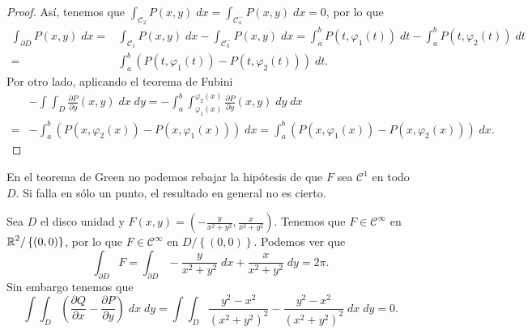 \begin{proof}
Así, tenemos que $\displaystyle \int _{\mathcal{C}_{2}}P\left(x,y\right) \; dx = \int _{\mathcal{C}_{4}^{-}}P\left(x,y\right) \; dx = 0 $, por lo que 
\[
\begin{split}
	\int _{\partial D}P\left(x,y\right) \; dx= &\int _{\mathcal{C}_{1}}P\left(x,y\right) \; dx-\int _{\mathcal{C}_{3}^{-}}P\left(x,y\right) \; dx
	=  \int^{b}_{a} P\left(t, \varphi_{1}\left(t\right)\right) \; dt - \int^{b}_{a} P\left(t, \varphi_{2}\left(t\right)\right) \; dt \\
	= &  \int^{b}_{a} \left(P\left(t, \varphi_{1}\left(t\right)\right)-P\left(t, \varphi_{2}\left(t\right)\right)\right) \; dt.
\end{split}
\]
Por otro lado, aplicando el teorema de Fubini
\[
\begin{split}
	&-\int \int _{D}\frac{\partial P}{\partial y}\left(x,y\right) \; dx \; dy =  - \int^{b}_{a} \int^{\varphi_{2}\left(x\right)}_{\varphi_{1}\left(x\right)} \frac{\partial P}{\partial y}\left(x,y\right) \; dy \; dx \\
	= & -\int^{b}_{a} \left(P\left(x,\varphi_{2}\left(x\right)\right)-P\left(x,\varphi_{1}\left(x\right)\right)\right) \; dx = \int^{b}_{a} \left(P\left(x, \varphi_{1}\left(x\right)\right)-P\left(x,\varphi_{2}\left(x\right)\right)\right) \; dx .
\end{split}
\]
\end{proof}
\begin{observation}
En el teorema de Green no podemos rebajar la hipótesis de que $\displaystyle F $ sea $\displaystyle \mathcal{C}^{1} $ en todo $\displaystyle D $. Si falla en sólo un punto, el resultado en general no es cierto.
\end{observation}
\begin{eg}
	Sea $\displaystyle D $ el disco unidad y $\displaystyle F\left(x,y\right)=\left(-\frac{y}{x^{2}+y^{2}}, \frac{x}{x^{2}+y^{2}}\right) $. Tenemos que $\displaystyle F \in \mathcal{C}^{\infty} $ en $\displaystyle \mathbb{R}^{2} / \left\{ \left(0,0\right)\right\}  $, por lo que $\displaystyle F \in \mathcal{C}^{\infty } $ en $\displaystyle D / \left\{ \left(0,0\right)\right\}  $. Podemos ver que
	\[\int _{\partial D}F =\int _{\partial D}-\frac{y}{x^{2}+y^{2}} \; dx + \frac{x}{x^{2}+y^{2}}\; dy =2\pi.\]
	Sin embargo tenemos que 
	\[\int \int _{D}\left(\frac{\partial Q}{\partial x}-\frac{\partial P}{\partial y}\right) \; dx \; dy = \int \int _{D}\frac{y^{2}-x^{2}}{\left(x^{2}+y^{2}\right)^{2}}-\frac{y^{2}-x^{2}}{\left(x^{2}+y^{2}\right)^{2}} \; dx \; dy = 0 .\]
\end{eg}
